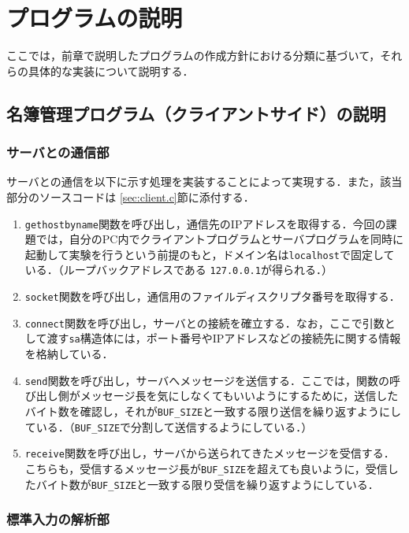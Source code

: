 \documentclass[11pt]{jsarticle}
\begin{document}
\section{プログラムの説明}

ここでは，前章で説明したプログラムの作成方針における分類に基づいて，それらの具体的な実装について説明する．

\subsection{名簿管理プログラム（クライアントサイド）の説明}

\subsubsection{サーバとの通信部}

サーバとの通信を以下に示す処理を実装することによって実現する．また，該当部分のソースコードは \ref{sec:client.c}節に添付する．

\begin{enumerate}
      \item {\tt gethostbyname}関数を呼び出し，通信先のIPアドレスを取得する．今回の課題では，自分のPC内でクライアントプログラムとサーバプログラムを同時に起動して実験を行うという前提のもと，ドメイン名は{\tt localhost}で固定している．（ループバックアドレスである {\tt 127.0.0.1}が得られる．）
      \item {\tt socket}関数を呼び出し，通信用のファイルディスクリプタ番号を取得する．
      \item {\tt connect}関数を呼び出し，サーバとの接続を確立する．なお，ここで引数として渡す{\tt sa}構造体には，ポート番号やIPアドレスなどの接続先に関する情報を格納している．
      \item {\tt send}関数を呼び出し，サーバへメッセージを送信する．ここでは，関数の呼び出し側がメッセージ長を気にしなくてもいいようにするために，送信したバイト数を確認し，それが{\tt BUF\_SIZE}と一致する限り送信を繰り返すようにしている．（{\tt BUF\_SIZE}で分割して送信するようにしている．）
      \item {\tt receive}関数を呼び出し，サーバから送られてきたメッセージを受信する．こちらも，受信するメッセージ長が{\tt BUF\_SIZE}を超えても良いように，受信したバイト数が{\tt BUF\_SIZE}と一致する限り受信を繰り返すようにしている．
\end{enumerate}

\subsubsection{標準入力の解析部}
\end{document}
